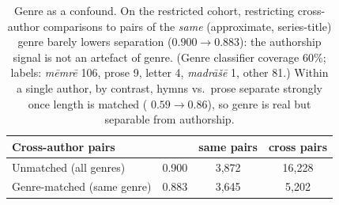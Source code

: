 \begin{table}[t]
  \centering
  \begin{tabular}{lccc}
    \toprule
    \textbf{Cross-author pairs} & \textbf{\auc{}} & \textbf{same pairs} & \textbf{cross pairs} \\
    \midrule
    Unmatched (all genres)        & 0.900 & 3{,}872 & 16{,}228 \\
    Genre-matched (same genre)    & 0.883 & 3{,}645 & 5{,}202 \\
    \bottomrule
  \end{tabular}
  \caption{Genre as a confound. On the restricted cohort, restricting cross-author
  comparisons to pairs of the \emph{same} (approximate, series-title) genre barely
  lowers separation \auc{} ($0.900\!\to\!0.883$): the authorship signal is not an
  artefact of genre. (Genre classifier coverage 60\%; labels: \emph{m\=emr\=e} 106,
  prose 9, letter 4, \emph{madr\=a\v{s}\=e} 1, other 81.) Within a single author,
  by contrast, hymns vs.\ prose separate strongly once length is matched
  (\auc{} $0.59\!\to\!0.86$), so genre is real but separable from authorship.}
  \label{tab:genre}
\end{table}
